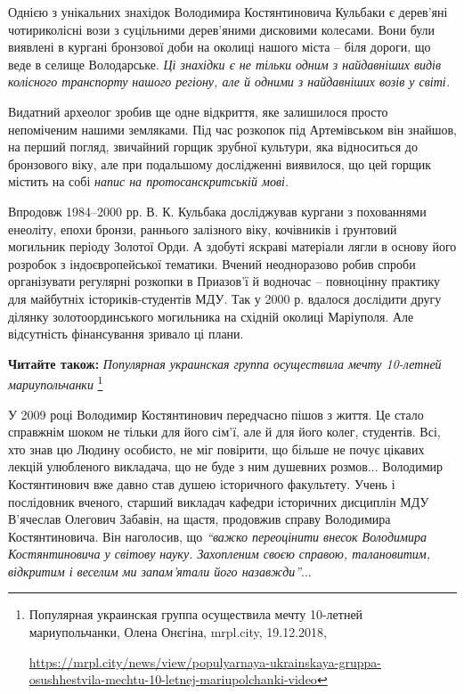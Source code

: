 Однією з унікальних знахідок Володимира Костянтиновича Кульбаки є дерев'яні
чотириколісні вози з суцільними дерев'яними дисковими колесами. Вони були
виявлені в кургані бронзової доби на околиці нашого міста – біля дороги, що
веде в селище Володарське. \emph{Ці знахідки є не тільки одним з найдавніших видів
колісного транспорту нашого регіону, але й одними з найдавніших возів у світі.}


Видатний археолог зробив ще одне відкриття, яке залишилося просто непоміченим
нашими земляками. Під час розкопок під Артемівськом він знайшов, на перший
погляд, звичайний горщик зрубної культури, яка відноситься до бронзового віку,
але при подальшому дослідженні виявилося, що цей горщик містить на собі \emph{напис
на протосанскритській мові.}

Впродовж 1984–2000 рр. В. К. Кульбака досліджував кургани з похованнями
енеоліту, епохи бронзи, раннього залізного віку, кочівників і ґрунтовий
могильник періоду Золотої Орди. А здобуті яскраві матеріали лягли в основу його
розробок з індоєвропейської тематики. Вчений неодноразово робив спроби
організувати регулярні розкопки в Приазов'ї й водночас – повноцінну практику
для майбутніх істориків-студентів МДУ. Так у 2000 р. вдалося дослідити другу
ділянку золотоординського могильника на східній околиці Маріуполя. Але
відсутність фінансування зривало ці плани.

\textbf{Читайте також:} \emph{Популярная украинская группа осуществила мечту 10-летней мариупольчанки}%
\footnote{Популярная украинская группа осуществила мечту 10-летней мариупольчанки, Олена Онєгіна, mrpl.city, 19.12.2018, \par%
\url{https://mrpl.city/news/view/populyarnaya-ukrainskaya-gruppa-osushhestvila-mechtu-10-letnej-mariupolchanki-video}%
}

У 2009 році Володимир Костянтинович передчасно пішов з життя. Це стало
справжнім шоком не тільки для його сім'ї, але й для його колег, студентів. Всі,
хто знав цю Людину особисто, не міг повірити, що більше не почує цікавих лекцій
улюбленого викладача, що не буде з ним душевних розмов... Володимир Костянтинович
вже давно став душею історичного факультету. Учень і послідовник вченого,
старший викладач кафедри історичних дисциплін МДУ В'ячеслав Олегович Забавін,
на щастя, продовжив справу Володимира Костянтиновича. Він наголосив, що \emph{\enquote{важко
переоцінити внесок Володимира Костянтиновича у світову науку. Захопленим своєю
справою, талановитим, відкритим і веселим ми запам'ятали його назавжди}}...
